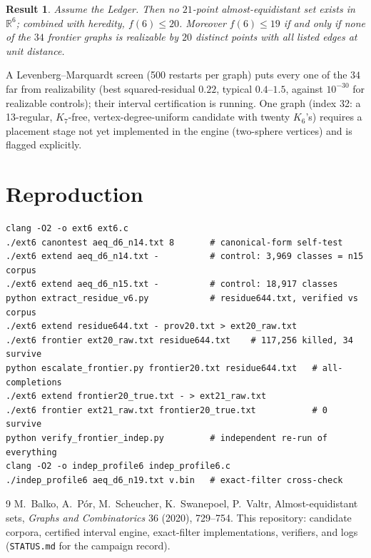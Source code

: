 \documentclass[11pt]{article}
\newtheorem*{result}{Result}
\newcommand{\R}{\mathbb{R}}
\begin{document}
\begin{result}
Assume the Ledger. Then no $21$-point almost-equidistant set exists in
$\R^6$; combined with heredity, $f(6)\le 20$. Moreover $f(6)\le 19$ if
and only if none of the $34$ frontier graphs is realizable by $20$
distinct points with all listed edges at unit distance.
\end{result}

A Levenberg--Marquardt screen (500 restarts per graph) puts every one of
the $34$ far from realizability (best squared-residual $0.22$, typical
$0.4$--$1.5$, against $10^{-30}$ for realizable controls); their interval
certification is running. One graph (index 32: a 13-regular, $K_7$-free,
vertex-degree-uniform candidate with twenty $K_6$'s) requires a
placement stage not yet implemented in the engine (two-sphere vertices)
and is flagged explicitly.

\section*{Reproduction}

\begin{verbatim}
clang -O2 -o ext6 ext6.c
./ext6 canontest aeq_d6_n14.txt 8       # canonical-form self-test
./ext6 extend aeq_d6_n14.txt -          # control: 3,969 classes = n15 corpus
./ext6 extend aeq_d6_n15.txt -          # control: 18,917 classes
python extract_residue_v6.py            # residue644.txt, verified vs corpus
./ext6 extend residue644.txt - prov20.txt > ext20_raw.txt
./ext6 frontier ext20_raw.txt residue644.txt    # 117,256 killed, 34 survive
python escalate_frontier.py frontier20.txt residue644.txt   # all-completions
./ext6 extend frontier20_true.txt - > ext21_raw.txt
./ext6 frontier ext21_raw.txt frontier20_true.txt           # 0 survive
python verify_frontier_indep.py         # independent re-run of everything
clang -O2 -o indep_profile6 indep_profile6.c
./indep_profile6 aeq_d6_n19.txt v.bin   # exact-filter cross-check
\end{verbatim}

\begin{thebibliography}{9}
 M.~Balko, A.~P\'or, M.~Scheucher, K.~Swanepoel,
P.~Valtr, Almost-equidistant sets, \emph{Graphs and Combinatorics} 36
(2020), 729--754.
 This repository: candidate corpora, certified interval
engine, exact-filter implementations, verifiers, and logs
(\texttt{STATUS.md} for the campaign record).
\end{thebibliography}
\end{document}
